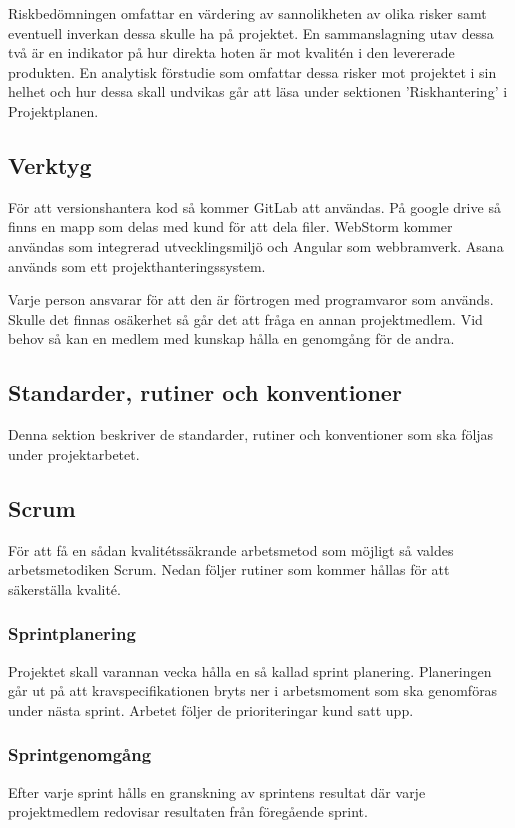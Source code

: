 \documentclass[a4paper,10pt]{article}
\begin{document}
Riskbedömningen omfattar en värdering av sannolikheten av olika risker samt eventuell inverkan dessa skulle ha på projektet. En sammanslagning utav dessa två är en indikator på hur direkta hoten är mot kvalitén i den levererade produkten.
En analytisk förstudie som omfattar dessa risker mot projektet i sin helhet och hur dessa skall undvikas går att läsa under sektionen 'Riskhantering' i Projektplanen. 

\subsection{Verktyg}

För att versionshantera kod så kommer GitLab att användas. På google drive så finns en mapp som delas med kund för att dela filer. WebStorm kommer användas som integrerad utvecklingsmiljö och Angular som webbramverk. Asana används som ett projekthanteringssystem.

Varje person ansvarar för att den är förtrogen med programvaror som används. Skulle det finnas osäkerhet så går det att fråga en annan projektmedlem. Vid behov så kan en medlem med kunskap hålla en genomgång för de andra.

\subsection{Standarder, rutiner och konventioner}
Denna sektion beskriver de standarder, rutiner och konventioner som ska följas under projektarbetet.

\subsection{Scrum}
För att få en sådan kvalitétssäkrande arbetsmetod som möjligt så valdes arbetsmetodiken Scrum. Nedan följer rutiner som kommer hållas för att säkerställa kvalité.

\subsubsection{Sprintplanering}
Projektet skall varannan vecka hålla en så kallad sprint planering. Planeringen går ut på att kravspecifikationen bryts ner i arbetsmoment som ska genomföras under nästa sprint. Arbetet följer de prioriteringar kund satt upp.

\subsubsection{Sprintgenomgång}
Efter varje sprint hålls en granskning av sprintens resultat där varje projektmedlem redovisar resultaten från föregående sprint. 
\end{document}
